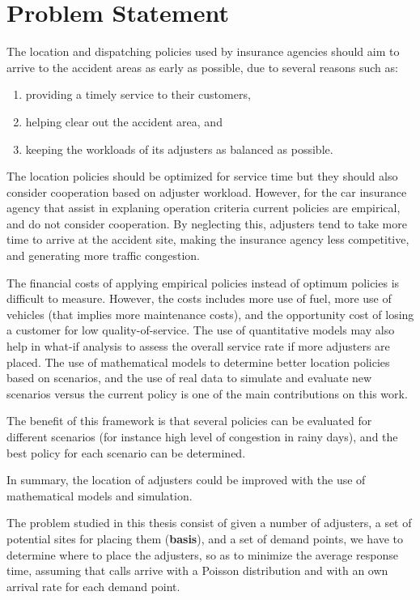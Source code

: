 \section{Problem Statement}

The location and dispatching policies
used by insurance agencies
should aim
to arrive to the accident areas
as early as possible,
due to several reasons
such as:
\begin{enumerate}
\item providing a timely service to their customers,
\item helping clear out the accident area, and
\item keeping the workloads of its adjusters
  as balanced as possible.
\end{enumerate}
The location policies
should be optimized for service time
but they should also consider
cooperation based on adjuster workload.
However,
for the car insurance agency
that assist in explaning operation criteria
current policies
are empirical,
and do not consider cooperation.
By neglecting this,
adjusters tend to take
more time to arrive at the accident site,
making the insurance agency
less competitive,
and generating more traffic congestion.

The financial costs
of applying
empirical policies
instead of optimum policies
is difficult to measure.
However,
the costs includes
more use of fuel,
more use of vehicles
(that implies
more maintenance costs),
and the opportunity cost
of losing a customer
for low quality-of-service.
The use of quantitative models
may also help
in what-if analysis
to assess the overall service rate
if more adjusters are placed.
The use of mathematical models
to determine better location policies
based on scenarios,
and the use of real data
to simulate and evaluate new scenarios
versus the current policy
is one of the main contributions
on this work.

The benefit of this framework
is that several policies
can be evaluated for different scenarios
(for instance high level of congestion in rainy days),
and the best policy for each scenario can be determined.

In summary,
the location of adjusters
could be improved
with the use of
mathematical models and simulation.

The problem studied in this thesis
consist of
given a number of adjusters,
a set of potential sites for placing them (\textbf{basis}),
and a set of demand points,
we have to determine
where to place the adjusters,
so as to minimize 
the average response time,
assuming
that calls
arrive with a Poisson distribution
and with an own arrival rate
for each demand point.
